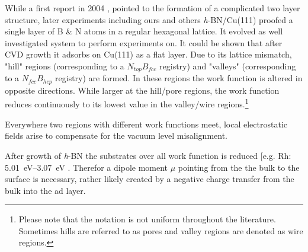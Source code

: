 While a first report in 2004 \cite{corso_boron_2004}, pointed to the formation of a complicated two layer structure, later experiments \cite{roth_chemical_2013, li_grain_2015} including ours \cite{joshi_boron_2012, schwarz_corrugation_2017} and others \textit{h}-BN/Cu(111) proofed a single layer of B \& N atoms in a regular hexagonal lattice. It evolved as well investigated system to perform experiments on. It could be shown that after CVD growth it adsorbs on Cu(111) as a flat layer. Due to its  lattice mismatch, "hill" regions  (corresponding to a $N_{top}B_{fcc}$ registry) and "valleys" (corresponding to a $N_{fcc}B_{hcp}$ registry) are formed. In these regions the work function is altered in opposite directions. While larger at the hill/pore regions, the work function reduces continuously to its lowest value in the valley/wire regions.\footnote{Please note that the notation is not uniform throughout the literature. Sometimes hills are referred to as pores and valley regions are denoted as wire regions.} 

Everywhere two regions with different work functions meet, local electrostatic fields arise to compensate for the vacuum level misalignment.

After growth of \textit{h}-BN the substrates over all work function is reduced [e.g. Rh: \SIrange{5.01}{3.07}{\eV} \cite{gomez_diaz_hexagonal_2013}. Therefor a dipole moment $\mu$ pointing from the the bulk to the surface is necessary, rather likely created by a negative charge transfer from the bulk into the ad layer.\cite{roman_periodic_2013}


